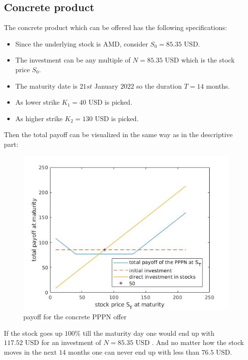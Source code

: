 \documentclass[11pt,oneside,a4paper]{article}
\begin{document}
	\subsection{Concrete product}
	The concrete product which can be offered has the following specifications:
	\begin{itemize}
		\item Since the underlying stock is AMD, consider $ S_0 = 85.35 \text{ USD} $.
		\item The investment can be any multiple of $ N = 85.35 \text{ USD} $ which is the stock price $ S_0 $.
		\item The maturity date is $ 21st $ January $ 2022 $ so the duration $ T = 14 $ months.
		\item As lower strike $ K_1 = 40 \text{ USD} $ is picked.
		\item As higher strike $ K_2 = 130 \text{ USD} $ is picked.
	\end{itemize}
	Then the total payoff can be visualized in the same way as in the descriptive part:
	\begin{figure}[H]
		\centering
		\includegraphics[width=0.8\linewidth]{PPPN_concrete.jpg}
		\caption{payoff for the concrete PPPN offer}
	\end{figure} 
	If the stock goes up $ 100 \% $ till the maturity day one would end up with $ 117.52 \text{ USD}$ for an investment of  $ N = 85.35 \text{ USD} $ . And no matter how the stock moves in the next $ 14 $ months one can never end up with less than $ 76.5 \text{ USD} $.
\end{document}
